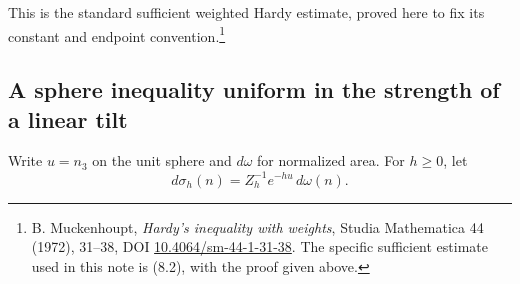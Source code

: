 \documentclass[11pt,oneside]{article}
\begin{document}
This is the standard sufficient
weighted Hardy estimate, proved
here to fix its constant and
endpoint convention.\footnote{
B. Muckenhoupt, \emph{Hardy's
inequality with weights},
Studia Mathematica 44 (1972),
31--38, DOI
\href{https://doi.org/10.4064/sm-44-1-31-38}
{10.4064/sm-44-1-31-38}.
The specific sufficient estimate
used in this note is (8.2),
with the proof given above.}

\subsection{A sphere inequality uniform in the strength of a linear tilt}

Write \(u=n_3\) on the unit sphere
and \(d\omega\) for normalized
area. For \(h\ge0\), let
\[
                    d\sigma_h(n)
                     =Z_h^{-1}e^{-hu}\,d\omega(n).
 \tag{8.5}
\]
\end{document}
